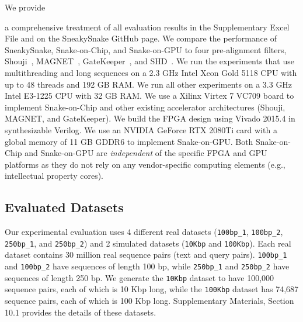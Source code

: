 We provide {a comprehensive treatment {of} all evaluation results in the {Supplementary Excel File} and {on the SneakySnake GitHub page}.
We compare the performance of SneakySnake, Snake-on-Chip, and Snake-on-GPU to {four} pre-alignment filters, Shouji~\citep{alser2019shouji}, MAGNET~\citep{alser2017magnet1}, GateKeeper~\citep{alser2017gatekeeper}, and SHD~\citep{xin2015shifted}. 
{We run the experiments that use multithreading and long sequences {on} a 2.3 GHz Intel Xeon Gold 5118 CPU with up to 48 threads and 192 GB RAM.} 
We run all other experiments {on} a 3.3 GHz Intel E3-1225 CPU with 32 GB RAM. We use a Xilinx Virtex 7 VC709 board \citep{guide2013virtex} to implement Snake-on-Chip and other existing accelerator architectures {(}Shouji, MAGNET, and GateKeeper). We build the FPGA design using Vivado 2015.4 in synthesizable Verilog. We use {an} NVIDIA GeForce RTX 2080Ti card \citep{guide2019Nvidia2080} with a global memory of 11 GB {GDDR6} to implement Snake-on-GPU. Both Snake-on-Chip and Snake-on-GPU are \emph{independent} of the specific FPGA and GPU platforms as they do not rely on any vendor-specific computing elements (e.g., intellectual property cores).

\subsection{{Evaluated Datasets}} \label{sec:experiment}
Our experimental evaluation uses 4 different real datasets (\texttt{100bp\_1}, \texttt{100bp\_2}, \texttt{250bp\_1}, and \texttt{250bp\_2}) and 2 simulated datasets (\texttt{10Kbp} and \texttt{100Kbp}). 
Each real dataset contains 30 million real sequence pairs (text and query pairs). \texttt{100bp\_1} and \texttt{100bp\_2} have sequences of length 100 bp, while \texttt{250bp\_1} and \texttt{250bp\_2} have sequences of length 250 bp.
We generate {the} \texttt{10Kbp} dataset to have 100,000 sequence pairs, each of which is 10 Kbp long, while {the} \texttt{100Kbp} dataset has 74,687 sequence pairs, each of which is 100 Kbp long.
{Supplementary Materials, Section 10.1 provides the details of these datasets}.


}

